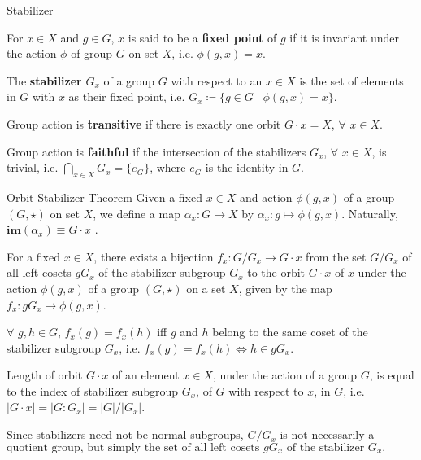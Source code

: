 \documentclass{beamer}
\newcommand\boldtext[1]{\textcolor{bolds}{\textbf{#1}}}
\begin{document}
\begin{frame}{Stabilizer}
    \begin{definition}
        For $x\in X$ and $g\in G$, $x$ is said to be a \boldtext{fixed point} of $g$ if it is invariant under the action $\phi$ of group $G$ on set $X$, i.e. $\phi(g,x)=x$.
    \end{definition}
    \begin{definition}
        The \boldtext{stabilizer} $G_x$ of a group $G$ with respect to an $x\in X$ is the set of elements in $G$ with $x$ as their fixed point, i.e. $G_x\coloneqq\{g\in G\mid\phi(g,x)=x\}$.
    \end{definition}
    \begin{definition}
        Group action is \boldtext{transitive} if there is exactly one orbit $G\cdot x=X$, $\forall$ $x\in X$.
    \end{definition}
    \begin{definition}
        Group action is \boldtext{faithful} if the intersection of the stabilizers $G_x$, $\forall$ $x\in X$, is trivial, i.e. $\bigcap\limits_{x\in X}G_x=\{e_G\}$, where $e_G$ is the identity in $G$. 
    \end{definition}
\end{frame}

\begin{frame}{Orbit-Stabilizer Theorem}
    Given a fixed $x\in X$ and action $\phi(g,x)$ of a group $(G,\star)$ on set $X$, we define a map $\alpha_x:G\xrightarrow{}X$ by $\alpha_x:g\mapsto \phi(g,x)$. Naturally, $\mathbf{im}(\alpha_x)\equiv G\cdot x$ .\\
    \begin{theorem}
        \begin{list}{\maltese}{\leftmargin=1em \itemindent=0em}
            \item For a fixed $x\in X$, there exists a bijection $f_x:G/G_x \xrightarrow{}G\cdot x$ from the set $G/G_x$ of all left cosets $gG_x$ of the stabilizer subgroup $G_x$ to the orbit $G\cdot x$ of $x$ under the action $\phi(g,x)$ of a group $(G,\star)$ on a set $X$, given by the map $f_x:gG_x\mapsto \phi(g,x)$.
            \item $\forall$ $g,h\in G$, $f_x(g)=f_x(h)$ iff $g$ and $h$ belong to the same coset of the stabilizer subgroup $G_x$, i.e. $f_x(g)=f_x(h)\iff h\in gG_x$.
            \item Length of orbit $G\cdot x$ of an element $x\in X$, under the action of a group $G$, is equal to the index of stabilizer subgroup $G_x$, of $G$ with respect to $x$, in $G$, i.e. $\lvert G\cdot x\rvert=\lvert G:G_x\rvert=\lvert G\rvert/\lvert G_x\rvert$. 
        \end{list}
    \end{theorem}
    Since stabilizers need not be normal subgroups, $G/G_x$ is not necessarily a $\text{quotient group, but simply the set of all left cosets }gG_x\text{ of the stabilizer }G_x.$
\end{frame}
\end{document}
